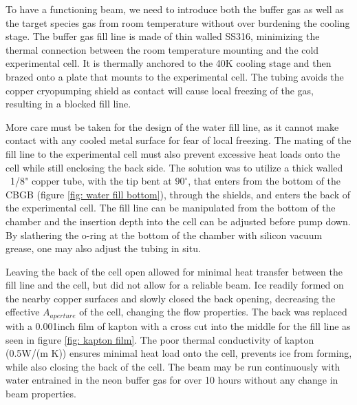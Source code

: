 To have a functioning beam, we need to introduce both the buffer gas as well as the target species gas from room temperature without over burdening the cooling stage. The buffer gas fill line is made of thin walled SS316, minimizing the thermal connection between the room temperature mounting and the cold experimental cell. It is thermally anchored to the 40K cooling stage and then brazed onto a plate that mounts to the experimental cell. The tubing avoids the copper cryopumping shield as contact will cause local freezing of the gas, resulting in a blocked fill line.

More care must be taken for the design of the water fill line, as it cannot make contact with any cooled metal surface for fear of local freezing. The mating of the fill line to the experimental cell must also prevent excessive heat loads onto the cell while still enclosing the back side. The solution was to utilize a thick walled ~1/8" copper tube, with the tip bent at $90^\circ$, that enters from the bottom of the CBGB (figure \ref{fig: water fill bottom}), through the shields, and enters the back of the experimental cell. The fill line can be manipulated from the bottom of the chamber and the insertion depth into the cell can be adjusted before pump down. By slathering the o-ring at the bottom of the chamber with silicon vacuum grease, one may also adjust the tubing in situ.

Leaving the back of the cell open allowed for minimal heat transfer between the fill line and the cell, but did not allow for a reliable beam. Ice readily formed on the nearby copper surfaces and slowly closed the back opening, decreasing the effective $A_{aperture}$ of the cell, changing the flow properties. The back was replaced with a 0.001inch film of kapton with a cross cut into the middle for the fill line as seen in figure \ref{fig: kapton film}. The poor thermal conductivity of kapton (0.5W/(m K)) ensures minimal heat load onto the cell, prevents ice from forming, while also closing the back of the cell. The beam may be run continuously with water entrained in the neon buffer gas for over 10 hours without any change in beam properties.

